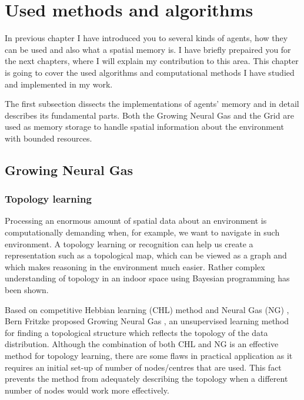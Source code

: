 \chapter{Used methods and algorithms}

In previous chapter I have introduced you to several kinds of agents, how they can be used and also what a spatial memory is. I have briefly prepaired you for the next chapters, where I will explain my contribution to this area. This chapter is going to cover the used algorithms and computational methods I have studied and implemented in my work. 

The first subsection dissects the implementations of agents' memory and in detail describes its fundamental parts. Both the Growing Neural Gas and the Grid are used as memory storage to handle spatial information about the environment with bounded resources.

\section{Growing Neural Gas}   
\label{usedalgo:gng}

\subsection{Topology learning}

Processing an enormous amount of spatial data about an environment is computationally demanding when, for example, we want to navigate in such environment. A topology learning or recognition can help us create a representation such as a topological map, which can be viewed as a graph and which makes reasoning in the environment much easier. Rather complex understanding of topology in an indoor space using Bayesian programming has been shown. \cite{Tapus:topologylearning}  

Based on competitive Hebbian learning (CHL) method \cite{Martinetz:chl} and Neural Gas (NG) \cite{Martinetz:ng}, Bern Fritzke proposed Growing Neural Gas \cite{Fritzke:gng}, an unsupervised learning method for finding a topological structure which reflects the topology of the data distribution. Although the combination of both CHL and NG is an effective method for topology learning, there are some flaws in practical application as it requires an initial set-up of number of nodes/centres that are used. This fact prevents the method from adequately describing the topology when a different number of nodes would work more effectively.

